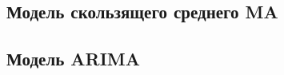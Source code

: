 \documentclass[../handbook.tex]{subfiles}
\begin{document}
\subsection{Модель скользящего среднего MA}

\subsection{Модель ARIMA}
\end{document}
